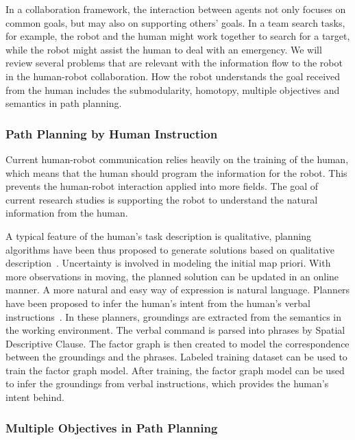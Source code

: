 \documentclass[phd]{byuprop}
\begin{document}
In a collaboration framework, the interaction between agents not only focuses on common goals, but may also on supporting others’ goals. 
In a team search tasks, for example, the robot and the human might work together to search for a target, while the robot might assist the human to deal with an emergency.
We will review several problems that are relevant with the information flow to the robot in the human-robot collaboration.
How the robot understands the goal received from the human includes the submodularity, homotopy, multiple objectives and semantics in path planning.

\subsubsection{Path Planning by Human Instruction}

Current human-robot communication relies heavily on the training of the human, which means that the human should program the information for the robot.
This prevents the human-robot interaction applied into more fields.
The goal of current research studies is supporting the robot to understand the natural information from the human.

A typical feature of the human's task description is qualitative, planning algorithms have been thus proposed to generate solutions based on qualitative description~\cite{mcclelland2012qualitative,6425551,mcclelland2014qualitative,shah2013qualitative}.
Uncertainty is involved in modeling the initial map priori.
With more observations in moving, the planned solution can be updated in an online manner.
A more natural and easy way of expression is natural language.
Planners have been proposed to infer the human's intent from the human's verbal instructions~\cite{howard2014natural,Duvallet2014}.
In these planners, groundings are extracted from the semantics in the working environment.
The verbal command is parsed into phrases by Spatial Descriptive Clause. 
The factor graph is then created to model the correspondence between the groundings and the phrases.
Labeled training dataset can be used to train the factor graph model.
After training, the factor graph model can be used to infer the groundings from verbal instructions, which provides the human's intent behind.

\subsubsection{Multiple Objectives in Path Planning}
\end{document}
